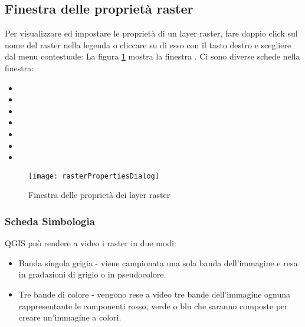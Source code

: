 \subsection{Finestra delle proprietà raster}\label{label_rasterprop}

Per visualizzare ed impostare le proprietà di un layer raster, fare doppio
click sul nome del raster nella legenda o cliccare su di esso con il tasto
destro e scegliere  dal menu contestuale:
La figura \ref{fig:raster_properties} mostra la finestra . 
Ci sono diverse schede nella finestra: 

\begin{itemize}
 \item {}
 \item {}
 \item {}
 \item {}
 \item {}
 \item {}
 \item {}
\end{itemize}

\begin{figure}[h]
  \begin{center}
   \caption{Finestra delle proprietà dei layer raster \nixcaption}\label{fig:raster_properties}\smallskip
   \texttt{[image: rasterPropertiesDialog]}
\end{center}  
\end{figure}

\subsubsection{Scheda Simbologia}\label{label_sombology}

QGIS può rendere a video i raster in due modi:

\begin{itemize}
\item Banda singola grigia - viene campionata una sola banda dell'immagine e
resa in gradazioni di grigio o in pseudocolore.
\item Tre bande di colore - vengono rese a video tre bande dell'immagine
ognuna rappresentante le componenti rosso, verde o blu che saranno composte
per creare un'immagine a colori.
\end{itemize}

